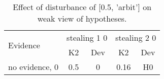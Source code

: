 \begin{table}\begin{tabular}{l|cc|cc}\toprule\multirow{2}{*}{Evidence} & \multicolumn{2}{c}{stealing 1 0}& \multicolumn{2}{c}{stealing 2 0}\\& {K2} & {Dev}& {K2} & {Dev}\\\midrule
no evidence, 0 & \cellcolor{Bittersweet}0.5&\cellcolor{Bittersweet}0&\cellcolor{Bittersweet}0.16&\cellcolor{Bittersweet}H0\\\bottomrule\end{tabular}\caption{Effect of disturbance of [0.5, 'arbit'] on weak view of hypotheses.}\end{table}